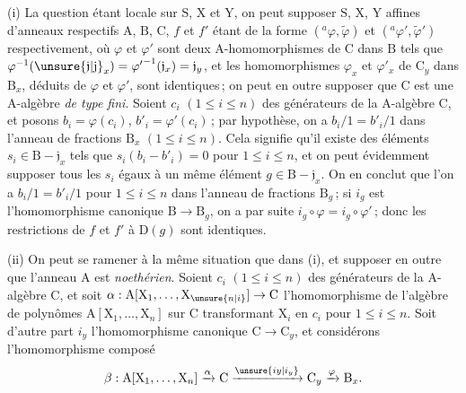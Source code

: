 (i) La question étant locale sur $\mathrm{S}$, $\mathrm{X}$ et $\mathrm{Y}$, on peut supposer $\mathrm{S}$, $\mathrm{X}$, $\mathrm{Y}$ affines d’anneaux respectifs $\mathrm{A}$, $\mathrm{B}$, $\mathrm{C}$, $f$ et $f'$ étant de la forme $({}^{a}\varphi,\widetilde{\varphi})$ et $({}^{a}\varphi',\widetilde{\varphi}')$ respectivement, où $\varphi$ et $\varphi'$ sont deux $\mathrm{A}$-homomorphismes de $\mathrm{C}$ dans $\mathrm{B}$ tels que $\varphi^{-1}(\unsure{\mathfrak{j}|\mathrm{j}}_x)={\varphi'}^{-1}(\mathfrak{j}_x)=\mathfrak{j}_y$, et les homomorphismes $\varphi_x$ et $\varphi'_x$ de $\mathrm{C}_y$ dans $\mathrm{B}_x$, déduits de $\varphi$ et $\varphi'$, sont identiques\,; on peut en outre supposer que $\mathrm{C}$ est une $\mathrm{A}$-algèbre \textit{de type fini}. Soient $c_i$ $(1\leqslant i\leqslant n)$ des générateurs de la $\mathrm{A}$-algèbre $\mathrm{C}$, et posons $b_i=\varphi(c_i)$, $b'_i=\varphi'(c_i)$\,; par hypothèse, on a $b_i/1=b'_i/1$ dans l’anneau de fractions $\mathrm{B}_x$ $(1\leqslant i\leqslant n)$. Cela signifie qu’il existe des éléments $s_i\in \mathrm{B}-\mathfrak{j}_x$ tels que $s_i(b_i-b'_i)=0$ pour $1\leqslant i\leqslant n$, et on peut évidemment supposer tous les $s_i$ égaux à un même élément $g\in \mathrm{B}-\mathfrak{j}_x$. On en conclut que l’on a $b_i/1=b'_i/1$ pour $1\leqslant i\leqslant n$ dans l’anneau de fractions $\mathrm{B}_g$\,; si $i_g$ est l’homomorphisme canonique $\mathrm{B}\to \mathrm{B}_g$, on a par suite $i_g\circ\varphi=i_g\circ\varphi'$\,; donc les restrictions de $f$ et $f'$ à $\mathrm{D}(g)$ sont identiques.

(ii) On peut se ramener à la même situation que dans (i), et supposer en outre que l’anneau $\mathrm{A}$ est \textit{noethérien}. Soient $c_i$ $(1\leqslant i\leqslant n)$ des générateurs de la $\mathrm{A}$-algèbre $\mathrm{C}$, et soit $\alpha:\mathrm{A}[\mathrm{X}_1,\ldots,\mathrm{X}_{\unsure{n|i}}]\to \mathrm{C}$ l’homomorphisme de l’algèbre de polynômes $\mathrm{A}[\mathrm{X}_1,\ldots,\mathrm{X}_n]$ sur $\mathrm{C}$ transformant $\mathrm{X}_i$ en $c_i$ pour $1\leqslant i\leqslant n$. Soit d’autre part $i_y$ l’homomorphisme canonique $\mathrm{C}\to \mathrm{C}_y$, et considérons l’homomorphisme composé
\[
\beta:\mathrm{A}[\mathrm{X}_1,\ldots,\mathrm{X}_n]\xrightarrow{\alpha}\mathrm{C}\xrightarrow{\unsure{iy|i_y}}\mathrm{C}_y\xrightarrow{\varphi}\mathrm{B}_x.
\]
